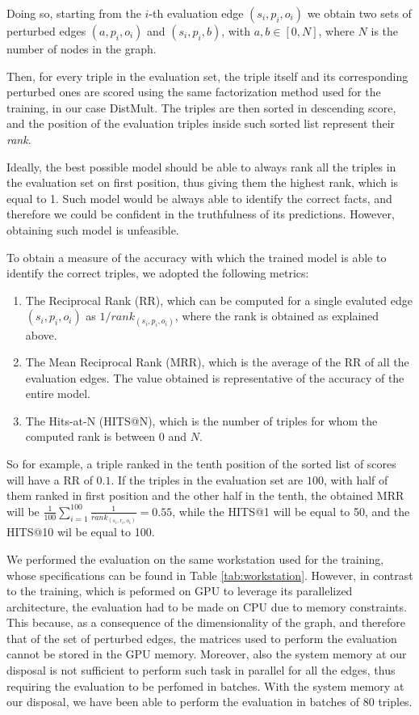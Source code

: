 \documentclass[%
    corpo=13.5pt,
    twoside,
    oldstyle,
    tipotesi=magistrale,
    greek,
    evenboxes
]{toptesi}
\begin{document}
Doing so, starting from the $i$-th evaluation edge $(s_i,p_i,o_i)$ we obtain
two sets of perturbed edges $(a,p_i,o_i)$ and $(s_i,p_i,b)$, with
$a,b \in [0, N]$, where $N$ is the number of nodes in the graph.

Then, for every triple in the evaluation set, the triple itself and its
corresponding perturbed ones are scored
using the same factorization method used for the training, in our case DistMult.
The triples are then sorted in descending score, and the position of
the evaluation triples inside such sorted list represent their \emph{rank}.

Ideally, the best possible model should be able to always rank all the triples
in the evaluation set on first position, thus giving them the highest rank,
which is equal to 1.
Such model would be always able to identify the correct facts, and therefore we
could be confident in the truthfulness of its predictions.
However, obtaining such model is unfeasible.
\newline

To obtain a measure of the accuracy with which the trained model is able to
identify the correct triples, we adopted the following metrics:

\begin{enumerate}
    \item The Reciprocal Rank (RR), which can be computed for a single
        evaluted edge $(s_i,p_i,o_i)$ as $1/rank_{(s_i,p_i,o_i)}$, where the
        rank is obtained as explained above.
    \item The Mean Reciprocal Rank (MRR), which is the average of the
        RR of all the evaluation edges. The value obtained is representative
        of the accuracy of the entire model.
    \item The Hits-at-N (HITS@N), which is the number of triples for whom the
        computed rank is between $0$ and $N$.
\end{enumerate}

So for example, a triple ranked in the tenth position of the sorted list of
scores will have a RR of $0.1$. If the triples in the evaluation set are $100$,
with half of them ranked in first position and the other half in the tenth, the
obtained MRR will be
$\frac{1}{100} \sum_{i=1}^{100} \frac{1}{rank_{(s_i,r_i,o_i)}} = 0.55$,
while the HITS@1 will be equal to 50, and the HITS@10 wil be
equal to 100.
\newline

We performed the evaluation on the same workstation used for the training,
whose specifications can be found in Table \ref{tab:workstation}.
However, in contrast to the training, which is peformed on GPU to leverage its
parallelized architecture, the evaluation had to be made on CPU due to memory
constraints.
This because, as a consequence of the dimensionality of the graph, and therefore
that of the set of perturbed edges, the matrices used to perform the
evaluation cannot be stored in the GPU memory.
Moreover, also the system memory at our disposal is not sufficient to perform
such task in parallel for all the edges, thus requiring the evaluation to be
perfomed in batches.
With the system memory at our disposal, we have been able to perform the
evaluation in batches of 80 triples.
\end{document}
